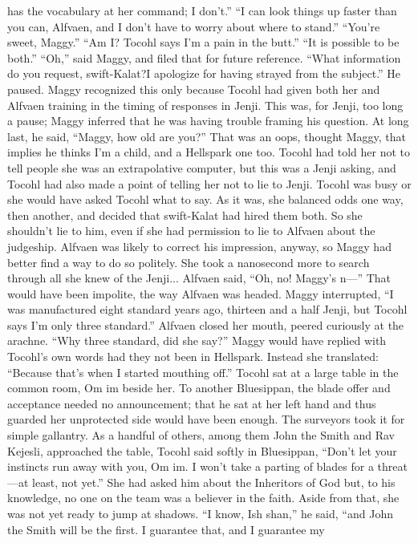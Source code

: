 \documentclass[9pt]{article}
\begin{document}
has the vocabulary at her command; I don’t.”
“I can look things up faster than you can, Alfvaen, and I don’t have to worry about where to stand.”
“You’re sweet, Maggy.”
“Am I? Tocohl says I’m a pain in the butt.”
“It is possible to be both.”
“Oh,” said Maggy, and filed that for future reference. “What information do you request, swift-Kalat?I apologize for having strayed from the subject.”
He paused. Maggy recognized this only because Tocohl had given both her and Alfvaen training in
the timing of responses in Jenji. This was, for Jenji, too long a pause; Maggy inferred that he was having
trouble framing his question.
At long last, he said, “Maggy, how old are you?”
That was an oops, thought Maggy, that implies he thinks I’m a child, and a Hellspark one too.
Tocohl had told her not to tell people she was an extrapolative computer, but this was a Jenji asking, and
Tocohl had also made a point of telling her not to lie to Jenji. Tocohl was busy or she would have asked
Tocohl what to say. As it was, she balanced odds one way, then another, and decided that swift-Kalat
had hired them both. So she shouldn’t lie to him, even if she had permission to lie to Alfvaen about the
judgeship. Alfvaen was likely to correct his impression, anyway, so Maggy had better find a way to do
so politely. She took a nanosecond more to search through all she knew of the Jenji...
Alfvaen said, “Oh, no! Maggy’s n—”
That would have been impolite, the way Alfvaen was headed. Maggy interrupted, “I was
manufactured eight standard years ago, thirteen and a half Jenji, but Tocohl says I’m only three
standard.”
Alfvaen closed her mouth, peered curiously at the arachne. “Why three standard, did she say?”
Maggy would have replied with Tocohl’s own words had they not been in Hellspark. Instead she
translated: “Because that’s when I started mouthing off.”
Tocohl sat at a large table in the common room, Om im beside her. To another Bluesippan, the blade
offer and acceptance needed no announcement; that he sat at her left hand and thus guarded her
unprotected side would have been enough. The surveyors took it for simple gallantry.
As a handful of others, among them John the Smith and Rav Kejesli, approached the table, Tocohl
said softly in Bluesippan, “Don’t let your instincts run away with you, Om im. I won’t take a parting of
blades for a threat—at least, not yet.” She had asked him about the Inheritors of God but, to his
knowledge, no one on the team was a believer in the faith. Aside from that, she was not yet ready to
jump at shadows.
“I know, Ish shan,” he said, “and John the Smith will be the first. I guarantee that, and I guarantee my
\end{document}
